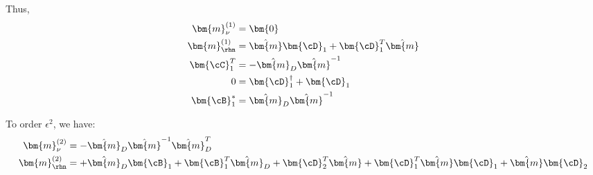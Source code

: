 Thus,
\begin{align}
	\bm{m}^{(1)}_{\nu}  & = \bm{0} \\
	\bm{m}^{(1)}_{\rhn} & =
	\hat{\bm{m}}\bm{\cD}_{1}
	+\bm{\cD}_{1}^{T}\hat{\bm{m}}  \\
	\bm{\cC}_{1}^{T}    & =
	-\hat{\bm{m}}_{D}\hat{\bm{m}}^{-1}
	\\
	0                   & =
	\bm{\cD}_{1}^{\dagger} +
	\bm{\cD}_{1}                   \\
	\bm{\cB}_{1}^{*}    & =
	\hat{\bm{m}}_{D}\hat{\bm{m}}^{-1}
\end{align}


To order \(\epsilon^{2}\), we have:
\begin{align}
	\bm{m}^{(2)}_{\nu}  & =
	-\hat{\bm{m}}_{D}\hat{\bm{m}}^{-1}
	\hat{\bm{m}}^{T}_{D}    \\
	\bm{m}^{(2)}_{\rhn} & =
	+ \hat{\bm{m}}_{D}\bm{\cB}_{1}
	+\bm{\cB}_{1}^{T}\hat{\bm{m}}_{D}
	+\bm{\cD}_{2}^{T}\hat{\bm{m}}
	+\bm{\cD}_{1}^{T}\hat{\bm{m}}\bm{\cD}_{1}
	+\hat{\bm{m}}\bm{\cD}_{2}
\end{align}
